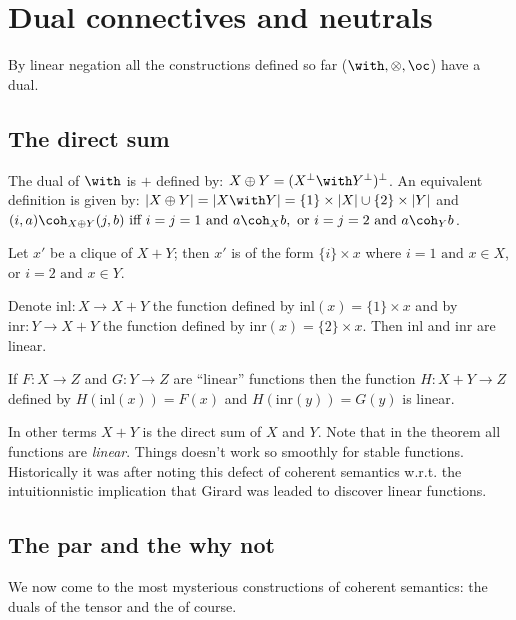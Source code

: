 \section{Dual connectives and neutrals}\label{dual-connectives-and-neutrals}

By linear negation all the constructions defined so far
(\(\with, \tens, \oc\)) have a dual.

\subsection{The direct sum}\label{the-direct-sum}

The dual of \(\with\) is \(\plus\) defined by:
\(X\plus Y = (X\orth\with Y\orth)\orth\). An equivalent definition is
given by:
\(\web{X\plus Y} = \web{X\with Y} = \{1\}\times \web X \cup \{2\}\times\web Y\)
and
\((i, a)\coh_{X\plus Y} (j, b)\text{ iff } i = j = 1 \text{ and } a\coh_X b,\text{ or }i = j = 2\text{ and } a\coh_Y b\).

\begin{theorem}
Let $x'$ be a clique of $X\plus Y$; then $x'$ is of the form $\{i\}\times x$ where $i = 1\text{ and }x\in X$, or $i = 2\text{ and }x\in Y$.

Denote $\mathrm{inl}:X\longrightarrow X\plus Y$ the function defined by $\mathrm{inl}(x) = \{1\}\times x$ and by $\mathrm{inr}:Y\longrightarrow X\plus Y$ the function defined by $\mathrm{inr}(x) = \{2\}\times x$. Then $\mathrm{inl}$ and $\mathrm{inr}$ are linear.

If $F:X\longrightarrow Z$ and $G:Y\longrightarrow Z$ are ``linear'' functions then the function $H:X\plus Y \longrightarrow Z$ defined by $H(\mathrm{inl}(x)) = F(x)$ and $H(\mathrm{inr}(y)) = G(y)$ is linear.
\end{theorem}

In other terms \(X\plus Y\) is the direct sum of \(X\) and \(Y\). Note
that in the theorem all functions are \emph{linear}. Things doesn't work
so smoothly for stable functions. Historically it was after noting this
defect of coherent semantics w.r.t. the intuitionnistic implication that
Girard was leaded to discover linear functions.

\subsection{The par and the why not}\label{the-par-and-the-why-not}

We now come to the most mysterious constructions of coherent semantics:
the duals of the tensor and the of course.


